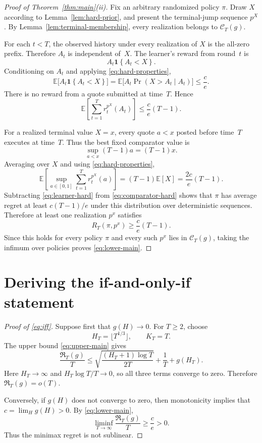 \documentclass[11pt]{article}
\theoremstyle{remark}
\newcommand{\ind}[1]{\mathbf{1}\!\left\{#1\right\}}
\newcommand{\E}{\mathbb{E}}
\newcommand{\C}{\mathcal{C}}
\newcommand{\Reg}{\mathfrak{R}}
\begin{document}
\begin{proof}[Proof of Theorem~\ref{thm:main}(ii)]
Fix an arbitrary randomized policy $\pi$.  Draw $X$ according to
Lemma~\ref{lem:hard-prior}, and present the terminal-jump sequence $p^X$.
By Lemma~\ref{lem:terminal-membership}, every realization belongs to
$\C_T(g)$.

For each $t<T$, the observed history under every realization of $X$ is the
all-zero prefix.  Therefore $A_t$ is independent of~$X$.  The learner's reward
from round~$t$ is
\[
    A_t\ind{A_t<X}.
\]
Conditioning on $A_t$ and applying \eqref{eq:hard-properties},
\[
    \E\bigl[A_t\ind{A_t<X}\bigr]
    =
    \E\bigl[A_t\Pr(X>A_t\mid A_t)\bigr]
    \le
    \frac{c}{e}.
\]
There is no reward from a quote submitted at time~$T$.  Hence
\begin{equation}\label{eq:learner-hard}
    \E\!\left[\sum_{t=1}^T r_t^{p^X}(A_t)\right]
    \le
    \frac{c}{e}(T-1).
\end{equation}

For a realized terminal value $X=x$, every quote $a<x$ posted before time~$T$
executes at time~$T$.  Thus the best fixed comparator value is
\[
    \sup_{a<x}(T-1)a=(T-1)x.
\]
Averaging over $X$ and using \eqref{eq:hard-properties},
\begin{equation}\label{eq:comparator-hard}
    \E\!\left[
        \sup_{a\in[0,1]}
        \sum_{t=1}^T r_t^{p^X}(a)
    \right]
    =(T-1)\E[X]
    =\frac{2c}{e}(T-1).
\end{equation}
Subtracting \eqref{eq:learner-hard} from \eqref{eq:comparator-hard} shows that
$\pi$ has average regret at least $c(T-1)/e$ under this distribution over
deterministic sequences.  Therefore at least one realization $p^x$ satisfies
\[
    R_T(\pi,p^x)\ge\frac{c}{e}(T-1).
\]
Since this holds for every policy $\pi$ and every such $p^x$ lies in
$\C_T(g)$, taking the infimum over policies proves \eqref{eq:lower-main}.
\end{proof}

\section{Deriving the if-and-only-if statement}

\begin{proof}[Proof of \eqref{eq:iff}]
Suppose first that $g(H)\to0$.  For $T\ge2$, choose
\[
    H_T=\lfloor T^{1/3}\rfloor,
    \qquad
    K_T=T.
\]
The upper bound \eqref{eq:upper-main} gives
\[
    \frac{\Reg_T(g)}{T}
    \le
    \sqrt{\frac{(H_T+1)\log T}{2T}}
    +\frac1T
    +g(H_T).
\]
Here $H_T\to\infty$ and $H_T\log T/T\to0$, so all three terms converge to
zero.  Therefore $\Reg_T(g)=o(T)$.

Conversely, if $g(H)$ does not converge to zero, then monotonicity implies that
$c=\lim_Hg(H)>0$.  By \eqref{eq:lower-main},
\[
    \liminf_{T\to\infty}\frac{\Reg_T(g)}{T}
    \ge
    \frac{c}{e}>0.
\]
Thus the minimax regret is not sublinear.
\end{proof}
\end{document}
